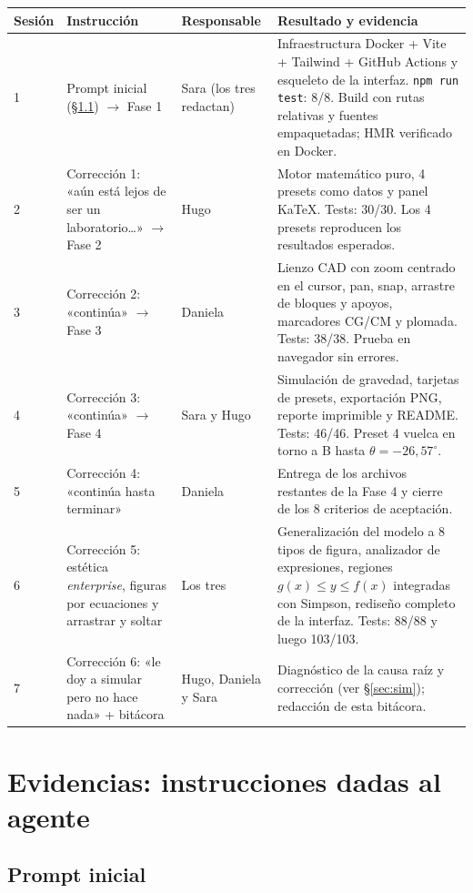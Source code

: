 \documentclass[11pt,a4paper]{article}
\begin{document}
\begin{longtable}{L{1.2cm}L{3.3cm}L{2.2cm}L{8.0cm}}
\toprule
\textbf{Sesión} & \textbf{Instrucción} & \textbf{Responsable} & \textbf{Resultado y evidencia}\\
\midrule
{} & Prompt inicial (§\ref{sec:prompt-inicial}) $\rightarrow$ Fase 1 & Sara (los tres redactan) &
Infraestructura Docker + Vite + Tailwind + GitHub Actions y esqueleto de la interfaz. \texttt{npm run test}: 8/8. Build con rutas relativas y fuentes empaquetadas; HMR verificado en Docker.\\
2 & Corrección 1: «aún está lejos de ser un laboratorio…» $\rightarrow$ Fase 2 & Hugo &
Motor matemático puro, 4 presets como datos y panel KaTeX. Tests: 30/30. Los 4 presets reproducen los resultados esperados.\\
3 & Corrección 2: «continúa» $\rightarrow$ Fase 3 & Daniela &
Lienzo CAD con zoom centrado en el cursor, pan, snap, arrastre de bloques y apoyos, marcadores CG/CM y plomada. Tests: 38/38. Prueba en navegador sin errores.\\
4 & Corrección 3: «continúa» $\rightarrow$ Fase 4 & Sara y Hugo &
Simulación de gravedad, tarjetas de presets, exportación PNG, reporte imprimible y README. Tests: 46/46. Preset 4 vuelca en torno a B hasta $\theta=-26{,}57^\circ$.\\
5 & Corrección 4: «continúa hasta terminar» & Daniela &
Entrega de los archivos restantes de la Fase 4 y cierre de los 8 criterios de aceptación.\\
6 & Corrección 5: estética \emph{enterprise}, figuras por ecuaciones y arrastrar y soltar & Los tres &
Generalización del modelo a 8 tipos de figura, analizador de expresiones, regiones $g(x)\le y\le f(x)$ integradas con Simpson, rediseño completo de la interfaz. Tests: 88/88 y luego 103/103.\\
7 & Corrección 6: «le doy a simular pero no hace nada» + bitácora & Hugo, Daniela y Sara &
Diagnóstico de la causa raíz y corrección (ver §\ref{sec:sim}); redacción de esta bitácora.\\
\bottomrule
\end{longtable}

\section{Evidencias: instrucciones dadas al agente}\label{sec:evidencias}

\subsection{Prompt inicial}\label{sec:prompt-inicial}
\end{document}
